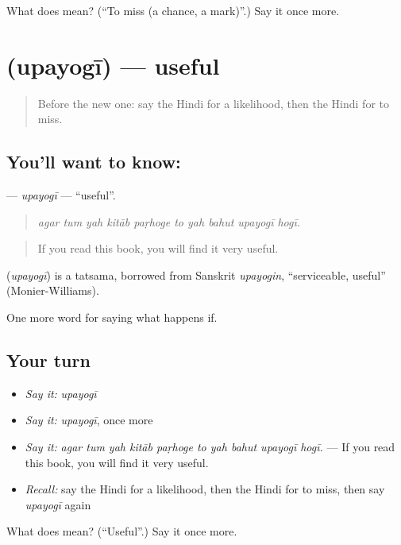 \begin{tcolorbox}[breakable,colback=teal!4,colframe=teal!35!black,title={Before you move on}]
What does  mean? (\textquotedblleft{}To miss (a chance, a mark)\textquotedblright{}.) Say it once more.
\end{tcolorbox}
\section[\texorpdfstring{\hi{उपयोगी} (upayogī)}{उपयोगी (upayogī)}]{ (upayogī) — useful}

\label{lesson:HI-C373-upayogi}



\begin{quote}
Before the new one: say the Hindi for a likelihood, then the Hindi for to miss.
\end{quote}

\subsection*{You'll want to know: }
\textbf{} — \emph{upayogī} — \textquotedblleft{}useful\textquotedblright{}.

\begin{quote}
         
\end{quote}

\begin{quote}
\emph{agar tum yah kitāb paṛhoge to yah bahut upayogī hogī.}
\end{quote}

\begin{quote}
If you read this book, you will find it very useful.
\end{quote}

\begin{cousinweb}
\textbf{} (\emph{upayogī}) is a tatsama, borrowed from Sanskrit \emph{upayogin}, \textquotedblleft{}serviceable, useful\textquotedblright{} (Monier-Williams).
\end{cousinweb}

\begin{grammarlens}[title={What you've built}]
One more word for saying what happens if.
\end{grammarlens}

\subsection*{Your turn}
\begin{itemize}
\raggedright
  \item \emph{Say it:} \emph{upayogī}
  \item \emph{Say it:} \emph{upayogī}, once more
  \item \emph{Say it:} \emph{agar tum yah kitāb paṛhoge to yah bahut upayogī hogī.} — If you read this book, you will find it very useful.
  \item \emph{Recall:} say the Hindi for a likelihood, then the Hindi for to miss, then say \emph{upayogī} again
\end{itemize}

\begin{tcolorbox}[breakable,colback=teal!4,colframe=teal!35!black,title={Before you move on}]
What does  mean? (\textquotedblleft{}Useful\textquotedblright{}.) Say it once more.
\end{tcolorbox}
